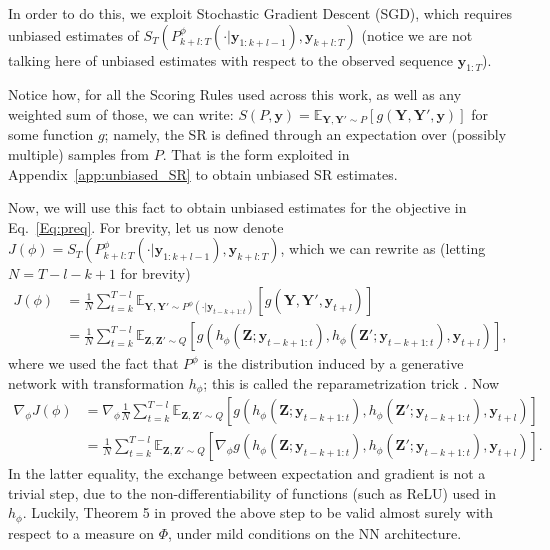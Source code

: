 \documentclass[twoside,11pt]{article}
\newcommand{\E}{\mathbb{E}}
\newcommand{\ddobs}{\mathbf{y}}
\newcommand{\Ddobs}{\mathbf{Y}}
\newcommand{\ddobsupT}{\mathbf{y}_{1:T}}
\begin{document}
	
	
	
	
	
	
	In order to do this, we exploit Stochastic Gradient Descent (SGD), which requires unbiased estimates of $  S_T (P^\phi_{k+l:T}(\cdot|\ddobs_{1:k+l-1}), \ddobs_{k+l:T}) $ (notice we are not talking here of unbiased estimates with respect to the observed sequence $\ddobsupT $). 
	
	
	
	
	
	
	Notice how, for all the Scoring Rules used across this work, as well as any weighted sum of those, we can write:
	$ S(P,\ddobs) = \E_{\Ddobs, \Ddobs'\sim P}\left[g(\Ddobs, \Ddobs',\ddobs)\right] $ for some function $ g $; namely, the SR is defined through an expectation over (possibly multiple) samples from $ P $. That is the form exploited in Appendix~\ref{app:unbiased_SR} to obtain unbiased SR estimates.
	
	Now, we will use this fact to obtain unbiased estimates for the objective in Eq.~\eqref{Eq:preq}. For brevity, let us now denote $ J(\phi ) = 	S_T (P^\phi_{k+l:T}(\cdot|\ddobs_{1:k+l-1}), \ddobs_{k+l:T}) $, which we can rewrite as (letting	$ N =T-l-k+1 $ for brevity)
	\begin{equation}\label{Eq:J2}
	\begin{aligned}
	J(\phi)&=\frac{1}{N}\sum\limits_{t=k}^{T-l} \E_{\Ddobs, \Ddobs'\sim P^\phi(\cdot|\ddobs_{t-k+1:t})}\left[g(\Ddobs, \Ddobs',\ddobs_{t+l})\right] \\
	&= \frac{1}{N}\sum\limits_{t=k}^{T-l} \E_{\mathbf{Z},\mathbf{Z}'\sim Q}\left[g(h_\phi(\mathbf{Z};\ddobs_{t-k+1:t}),h_\phi(\mathbf{Z}';\ddobs_{t-k+1:t}),\ddobs_{t+l})\right],
	\end{aligned}
	\end{equation}
	where we used the fact that $ P^\phi$ is the distribution induced by a generative network with transformation $ h_\phi$; this is called the reparametrization trick \cite{kingma2013auto}. Now
	\begin{equation}\label{Eq:J_grad}
	\begin{aligned}
	\nabla_\phi J(\phi)&= \nabla_\phi \frac{1}{N}\sum\limits_{t=k}^{T-l} \E_{\mathbf{Z},\mathbf{Z}'\sim Q}\left[g(h_\phi(\mathbf{Z};\ddobs_{t-k+1:t}),h_\phi(\mathbf{Z}';\ddobs_{t-k+1:t}),\ddobs_{t+l})\right] \\
	&= \frac{1}{N}\sum\limits_{t=k}^{T-l} \E_{\mathbf{Z},\mathbf{Z}'\sim Q}\left[\nabla_\phi  g\left(h_\phi(\mathbf{Z};\ddobs_{t-k+1:t}),h_\phi(\mathbf{Z}';\ddobs_{t-k+1:t}),\ddobs_{t+l}\right)\right].
	\end{aligned}
	\end{equation}
	In the latter equality, the exchange between expectation and gradient is not a trivial step, due to the non-differentiability of functions (such as ReLU) used in $ h_\phi $. Luckily, Theorem 5 in \cite{binkowski2018demystifying} proved the above step to be valid almost surely with respect to a measure on $ \Phi $, under mild conditions on the NN architecture.
	
\end{document}
